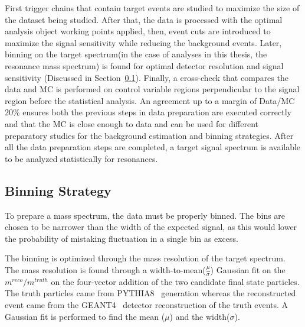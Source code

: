 First trigger chains that contain target events are studied to maximize the size of the dataset being studied. After that, the data is processed with the optimal analysis object working points applied, then, event cuts are introduced to maximize the signal sensitivity while reducing the background events. Later, binning on the target spectrum(in the case of analyses in this thesis, the resonance mass spectrum) is found for optimal detector resolution and signal sensitivity (Discussed in
Section~\ref{sec:binning}). Finally, a cross-check that compares the data and MC is performed on control variable regions perpendicular to the signal region before the statistical analysis. An agreement up to a margin of Data/MC 20\% ensures both the previous steps in data preparation are executed correctly and that the MC is close enough to data and can be used for different preparatory studies for the background estimation and binning strategies. After all the data preparation steps are completed, a target signal spectrum is available to be analyzed statistically for resonances. 

\subsection{Binning Strategy} 
\label{sec:binning}

To prepare a mass spectrum, the data must be properly binned. The bins are chosen to be narrower than the width of the expected signal, as this would lower the probability of mistaking fluctuation in a single bin as excess.

The binning is optimized through the mass resolution of the target spectrum. The mass resolution is found through a width-to-mean($\frac{\mu}{\sigma}$) Gaussian fit on the $m^{reco}/m^{truth}$ on the four-vector addition of the two candidate final state particles. The truth particles came from PYTHIA8~\cite{PYTHIA} generation whereas the reconstructed event came from the GEANT4~\cite{Agostinelli:602040} detector reconstruction of the truth events. A Gaussian fit is performed to find the mean ($\mu$) and the width($\sigma$). 



